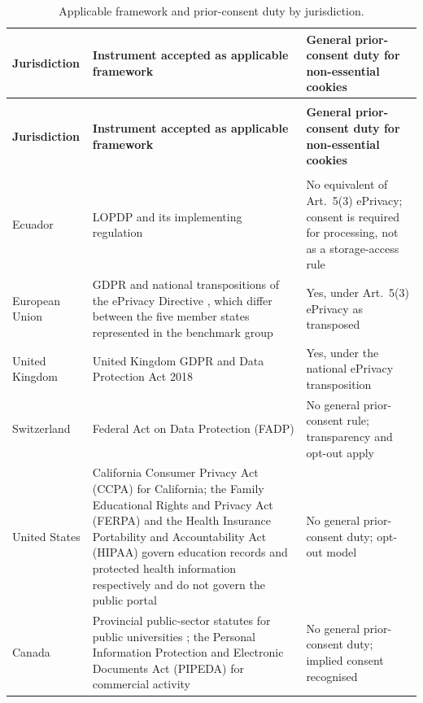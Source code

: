 \documentclass[]{interact}
\begin{document}
\footnotesize
\begin{longtable}{@{}>{\RaggedRight}p{2.4cm}>{\RaggedRight}p{5.5cm}>{\RaggedRight\arraybackslash}p{4.1cm}@{}}
	\caption{Applicable framework and prior-consent duty by jurisdiction.}\label{tab:mapeo}\\
	\toprule
	\textbf{Jurisdiction} & \textbf{Instrument accepted as applicable framework} & \textbf{General prior-consent duty for non-essential cookies} \\
	\midrule
	\endfirsthead
	\multicolumn{3}{c}{\textit{(Table~\ref{tab:mapeo}, continued)}}\\
	\toprule
	\textbf{Jurisdiction} & \textbf{Instrument accepted as applicable framework} & \textbf{General prior-consent duty for non-essential cookies} \\
	\midrule
	\endhead
	\midrule
	\multicolumn{3}{r}{\textit{Continued on next page}}\\
	\endfoot
	\bottomrule
	\endlastfoot
	Ecuador & LOPDP and its implementing regulation \citep{lopdp2021,reglamentolopdp2023} & No equivalent of Art.\ 5(3) ePrivacy; consent is required for processing, not as a storage-access rule \\
	\addlinespace
	European Union & GDPR \citep{gdpr2016} and national transpositions of the ePrivacy Directive \citep{eprivacy2002}, which differ between the five member states represented in the benchmark group & Yes, under Art.\ 5(3) ePrivacy as transposed \citep{edpb2024eprivacy} \\
	\addlinespace
	United Kingdom & United Kingdom GDPR and Data Protection Act 2018 \citep{ukdpa2018} & Yes, under the national ePrivacy transposition \\
	\addlinespace
	Switzerland & Federal Act on Data Protection (FADP) \citep{fadp_ch} & No general prior-consent rule; transparency and opt-out apply \\
	\addlinespace
	United States & California Consumer Privacy Act (CCPA) \citep{ccpa2018} for California; the Family Educational Rights and Privacy Act (FERPA) \citep{ferpa1974} and the Health Insurance Portability and Accountability Act (HIPAA) \citep{hipaa1996} govern education records and protected health information respectively and do not govern the public portal & No general prior-consent duty; opt-out model \\
	\addlinespace
	Canada & Provincial public-sector statutes for public universities \citep{fippa_on,fippa_bc,quebec_privacy}; the Personal Information Protection and Electronic Documents Act (PIPEDA) \citep{pipeda2000} for commercial activity & No general prior-consent duty; implied consent recognised \\

\end{longtable}
\end{document}

